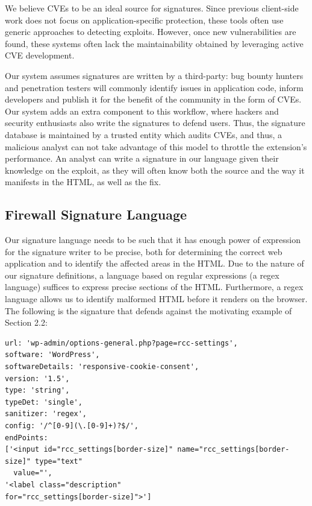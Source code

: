 	 We believe CVEs to be an ideal source for signatures. Since previous client-side work does not focus on application-specific protection, these tools often use generic approaches to detecting exploits. However, once new vulnerabilities are found, these systems often lack the maintainability obtained by leveraging active CVE development. 
	 
	 Our system assumes signatures are written by a third-party: bug bounty hunters and penetration testers will commonly identify issues in application code, inform developers and publish it for the benefit of the community in the form of CVEs. Our system adds an extra component to this workflow, where hackers and security enthusiasts also write the signatures to defend users. Thus, the signature database is maintained by a trusted entity which audits CVEs, and thus, a malicious analyst can not take advantage of this model to throttle the extension's performance. An analyst can write a signature in our language given their knowledge on the exploit, as they will often know both the source and the way it manifests in the HTML, as well as the fix.
 
 \subsection{Firewall Signature Language} \label{signature_language}
 Our signature language needs to be such that it has enough power of expression for the signature writer to be precise, both for determining the correct web application and to identify the affected areas in the HTML. Due to the nature of our signature definitions, a language based on regular expressions (a regex language) suffices to express precise sections of the HTML. Furthermore, a regex language allows us to identify malformed HTML before it renders on the browser. The following is the signature that defends against the motivating example of Section 2.2:
 \lstset{basicstyle=\small}
\begin{lstlisting}[breaklines=true,caption={An \sys signature},label={lst:xsnare_signature}]
url: 'wp-admin/options-general.php?page=rcc-settings',
software: 'WordPress',
softwareDetails: 'responsive-cookie-consent',
version: '1.5',
type: 'string',
typeDet: 'single',
sanitizer: 'regex',
config: '/^[0-9](\.[0-9]+)?$/',
endPoints: 
['<input id="rcc_settings[border-size]" name="rcc_settings[border-size]" type="text"
  value="',
'<label class="description" 
for="rcc_settings[border-size]">']
\end{lstlisting}

